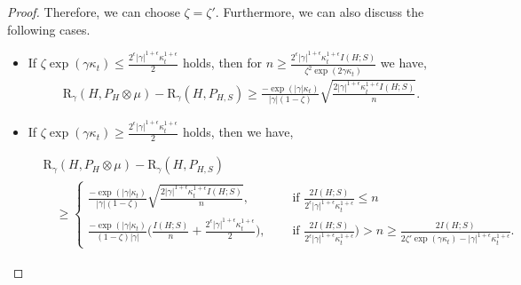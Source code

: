 \documentclass{article}
\theoremstyle{plain}
\theoremstyle{plain}
\theoremstyle{definition}
\theoremstyle{remark}
\newcommand{\RTET}{\mathrm{R}_{\gamma}}
\begin{document}
\begin{proof}
Therefore, we can choose $\zeta= \zeta'$. Furthermore, we can also discuss the following cases.
\begin{itemize}
    \item  If $\zeta \exp(\gamma\kappa_t)\leq\frac{2^{\epsilon}|\gamma|^{1+\epsilon} \kappa_t^{1+\epsilon}}{2}$ holds, then for $n\geq \frac{2^{\epsilon}|\gamma|^{1+\epsilon} \kappa_t^{1+\epsilon} I(H;S)}{ \zeta^2\exp(2\gamma \kappa_t)}$ we have,
    \begin{equation*}
    \begin{split}
          \RTET(H,P_{H}\otimes \mu)-\RTET(H,P_{H,S})\geq  \frac{-\exp(|\gamma| \kappa_t)}{|\gamma|(1-\zeta)} \sqrt{\frac{2|\gamma|^{1+\epsilon} \kappa_t^{1+\epsilon} I(H;S)}{n}}.
    \end{split}
\end{equation*}
    \item If $\zeta \exp(\gamma\kappa_t)\geq\frac{2^{\epsilon}|\gamma|^{1+\epsilon} \kappa_t^{1+\epsilon}}{2}$ holds, then we have,

    \begin{equation*}
    \begin{split}
          &\RTET(H,P_{H}\otimes \mu)-\RTET(H,P_{H,S})\\&\quad\geq  \begin{cases}
            \frac{-\exp(|\gamma| \kappa_t)}{|\gamma|(1-\zeta)} \sqrt{\frac{2|\gamma|^{1+\epsilon} \kappa_t^{1+\epsilon} I(H;S)}{n}},\quad &\mbox{ if } \frac{2I(H;S)}{2^{\epsilon}|\gamma|^{1+\epsilon} \kappa_t^{1+\epsilon}}\leq n\\
              \frac{-\exp(|\gamma| \kappa_t)}{(1-\zeta) |\gamma|}\Big( \frac{ I(H;S)}{n}+\frac{2^{\epsilon}|\gamma|^{1+\epsilon} \kappa_t^{1+\epsilon}}{2}\Big),\quad & \mbox{ if }\frac{2I(H;S)}{2^{\epsilon}|\gamma|^{1+\epsilon} \kappa_t^{1+\epsilon}})>n\geq\frac{2I(H;S)}{2\zeta' \exp(\gamma\kappa_t)-|\gamma|^{1+\epsilon} \kappa_t^{1+\epsilon}}.
          \end{cases}
    \end{split}
\end{equation*}

\end{itemize}
\end{proof}
\end{document}
